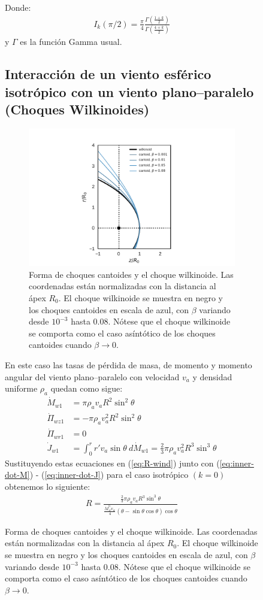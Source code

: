 \begin{figure}
Donde:
\begin{align}
I_k(\pi/2) = \frac{\pi}{4}\frac{\Gamma\left(\frac{1+k}{2}\right)}{\Gamma\left(\frac{4+k}{2}\right)} 
\end{align}
y $\Gamma$ es la función Gamma usual.
\subsection{Interacción de un viento esférico isotrópico con un viento plano--paralelo (Choques Wilkinoides)}
\label{sec:wilkinoids}
\begin{figure} \includegraphics[width=0.6\linewidth]{./Figures/cantoid-wilkinoid-shape}
  \caption{Forma de choques cantoides y el choque wilkinoide. Las coordenadas están normalizadas con la distancia al ápex $R_0$. El choque wilkinoide se muestra en negro y los choques cantoides en escala de azul, con $\beta$ variando desde $10^{-3}$ hasta 0.08. Nótese que el choque wilkinoide se comporta como el caso asíntótico de los choques cantoides cuando $\beta\to 0$.}
\end{figure}
En este caso las tasas de pérdida de masa, de momento y momento angular del viento plano--paralelo con velocidad $v_a$ y densidad uniforme $\rho_a$ quedan como sigue:
\begin{align}
  \dot{M}_{w1} &= \pi \rho_a v_a R^2 \sin^2\theta\\
  \dot{\Pi}_{wz1} &= - \pi\rho_a v^2_a R^2 \sin^2\theta\\
  \dot{\Pi}_{wr1} &= 0 \\
  \dot{J}_{w1} &= \int^r_0 r'v_a \sin\theta~d\dot{M}_{w1} = \frac{2}{3}\pi\rho_a v_a^2 R^3 \sin^3\theta 
\end{align}
Sustituyendo estas ecuaciones en (\ref{eq:R-wind}) junto con (\ref{eq:inner-dot-M}) - (\ref{eq:inner-dot-J}) para el caso isotrópico $(k=0)$ obtenemos lo siguiente:
\small
\begin{align}
  R = \frac{\frac{2}{3}\pi\rho_a v_a R^3 \sin^3\theta}{\frac{\dot{M}^0_w v_w}{4}\left(\theta-\sin\theta\cos\theta\right)\cos\theta
}
\end{align}
\end{figure}
